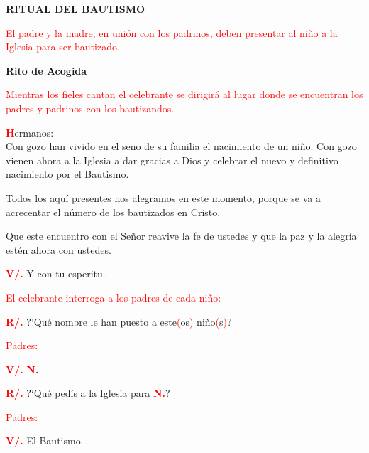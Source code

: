 \documentclass[12pt, letterpaper]{report}
\begin{document}
\begin{center}
\Huge {\bfseries RITUAL DEL BAUTISMO}
\end{center}

\large {\textcolor{red}{El padre y la madre, en uni\'on con los padrinos, deben presentar al ni\~no a la Iglesia para ser bautizado.}}

\begin{center}
\Huge {\bfseries Rito de Acogida}
\end{center}

\large {\textcolor{red}{Mientras los fieles cantan el celebrante se dirigir\'a al lugar donde se encuentran los padres y padrinos con los bautizandos.}}

\lettrine[lines=1]{\bfseries \textcolor{red}{H}}{}\Large {ermanos:}\\
\Large{Con gozo han vivido en el seno de su familia el nacimiento de un ni\~no. Con gozo vienen ahora a la Iglesia a dar gracias a Dios y celebrar el nuevo y definitivo nacimiento por el Bautismo.}

\noindent
\Large {Todos los aqu\'i presentes nos alegramos en este momento, porque se va a acrecentar el n\'umero de los bautizados en Cristo.}

\noindent
\Large {Que este encuentro con el Se\~nor reavive la fe de ustedes y que la paz y la alegr\'ia est\'en ahora con ustedes.}

\Large{{\bfseries \textcolor{red}{V/.}} \hspace{1cm} Y con tu esperitu.}

\large {\textcolor{red}{El celebrante interroga a los padres de cada ni\~no:}}

\Large {\bfseries \textcolor{red}{R/.}} \hspace{1cm} ?`Qu\'e nombre le han puesto a este\textcolor{red}{(}os\textcolor{red}{)} ni\~no\textcolor{red}{(}s\textcolor{red}{)}?

\large {\textcolor{red}{Padres:}}

{\bfseries \textcolor{red}{V/.}} \hspace{1cm} \Large {\bfseries \textcolor{red}{N.}}

\Large {{\bfseries \textcolor{red}{R/.}} \hspace{1cm} ?`Qu\'e ped\'is a la Iglesia para \bfseries \textcolor{red}{N.}}?

\large {\textcolor{red}{Padres:}}

{\bfseries \textcolor{red}{V/.}} \hspace{1cm} El Bautismo.
\end{document}
